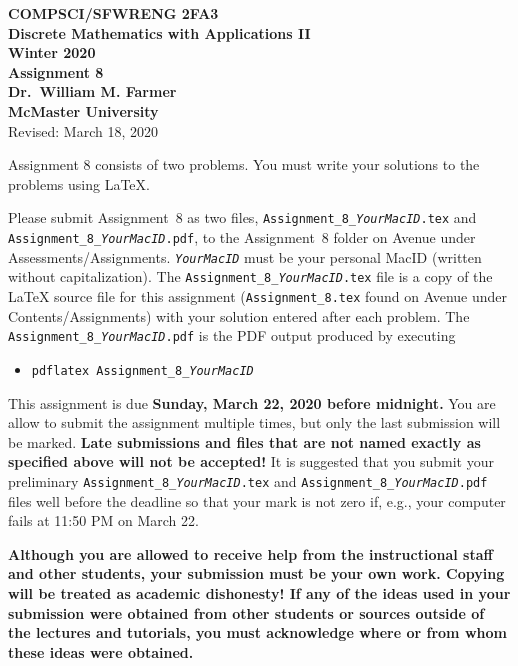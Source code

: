 \documentclass[11pt,fleqn]{article}
\begin{document}
\begin{center}

  {\large \textbf{COMPSCI/SFWRENG 2FA3}}\\[2mm]
  {\large \textbf{Discrete Mathematics with Applications II}}\\[2mm]
  {\large \textbf{Winter 2020}}\\[8mm]
  {\huge \textbf{Assignment 8}}\\[6mm]
  {\large \textbf{Dr.~William M. Farmer}}\\[2mm]
  {\large \textbf{McMaster University}}\\[6mm]
  {\large Revised: March 18, 2020}

\end{center}

\medskip

Assignment 8 consists of two problems.  You must write your solutions
to the problems using LaTeX.

Please submit Assignment~8 as two files,
\texttt{Assignment\_8\_\emph{YourMacID}.tex} and
\texttt{Assignment\_8\_\emph{YourMacID}.pdf}, to the Assignment~8
folder on Avenue under Assessments/Assignments.
\texttt{\emph{YourMacID}} must be your personal MacID (written without
capitalization).  The \texttt{Assignment\_8\_\emph{YourMacID}.tex}
file is a copy of the LaTeX source file for this assignment
(\texttt{Assignment\_8.tex} found on Avenue under
Contents/Assignments) with your solution entered after each problem.
The \texttt{Assignment\_8\_\emph{YourMacID}.pdf} is the PDF output
produced by executing

\begin{itemize}

  \item[] \texttt{pdflatex Assignment\_8\_\emph{YourMacID}}

\end{itemize}

This assignment is due \textbf{Sunday, March 22, 2020 before
  midnight.}  You are allow to submit the assignment multiple times,
but only the last submission will be marked.  \textbf{Late submissions
  and files that are not named exactly as specified above will not be
  accepted!}  It is suggested that you submit your preliminary
\texttt{Assignment\_8\_\emph{YourMacID}.tex} and
\texttt{Assignment\_8\_\emph{YourMacID}.pdf} files well before the
deadline so that your mark is not zero if, e.g., your computer fails
at 11:50 PM on March 22.

\textbf{Although you are allowed to receive help from the
  instructional staff and other students, your submission must be your
  own work.  Copying will be treated as academic dishonesty! If any of
  the ideas used in your submission were obtained from other students
  or sources outside of the lectures and tutorials, you must
  acknowledge where or from whom these ideas were obtained.}
\end{document}
